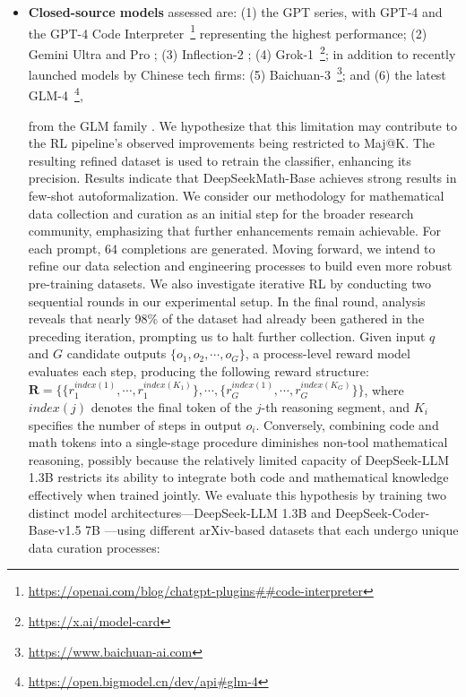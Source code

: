 \begin{itemize}[topsep=0pt]
    \item \textbf{Closed-source models} assessed are: (1) the GPT series, with GPT-4 \citep{gpt4} and the GPT-4 Code Interpreter~\footnote{\url{https://openai.com/blog/chatgpt-plugins\#\#code-interpreter}} representing the highest performance; (2) Gemini Ultra and Pro \citep{gemini}; (3) Inflection-2 \citep{inflection-2}; (4) Grok-1~\footnote{\url{https://x.ai/model-card}}; in addition to recently launched models by Chinese tech firms: (5) Baichuan-3~\footnote{\url{https://www.baichuan-ai.com}}; and (6) the latest GLM-4~\footnote{\url{https://open.bigmodel.cn/dev/api\#glm-4}},

    from the GLM family \citep{glm}. We hypothesize that this limitation may contribute to the RL pipeline’s observed improvements being restricted to Maj@K. The resulting refined dataset is used to retrain the classifier, enhancing its precision. Results indicate that DeepSeekMath-Base achieves strong results in few-shot autoformalization. We consider our methodology for mathematical data collection and curation as an initial step for the broader research community, emphasizing that further enhancements remain achievable. For each prompt, $64$ completions are generated. Moving forward, we intend to refine our data selection and engineering processes to build even more robust pre-training datasets. We also investigate iterative RL by conducting two sequential rounds in our experimental setup. In the final round, analysis reveals that nearly 98\% of the dataset had already been gathered in the preceding iteration, prompting us to halt further collection. Given input $q$ and $G$ candidate outputs $\{o_1, o_2, \cdots, o_G\}$, a process-level reward model evaluates each step, producing the following reward structure: $\mathbf{R} = \{ \{r_1^{index(1)},\cdots,r_1^{index(K_1)}\}, \cdots,  \{r_G^{index(1)},\cdots,r_G^{index(K_G)}\} \}$, where $index(j)$ denotes the final token of the $j$-th reasoning segment, and $K_i$ specifies the number of steps in output $o_i$. Conversely, combining code and math tokens into a single-stage procedure diminishes non-tool mathematical reasoning, possibly because the relatively limited capacity of DeepSeek-LLM 1.3B restricts its ability to integrate both code and mathematical knowledge effectively when trained jointly. We evaluate this hypothesis by training two distinct model architectures—DeepSeek-LLM 1.3B and DeepSeek-Coder-Base-v1.5 7B \citep{deepseek-coder}—using different arXiv-based datasets that each undergo unique data curation processes:


\end{itemize}

